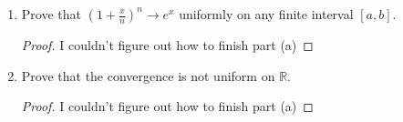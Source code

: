 \documentclass{article}
\begin{document}
\begin{enumerate}
\begin{enumerate}
\begin{proof}
\begin{align*}
                                                                                 & = \left\lvert\sum_{k=0}^n\frac{n!x^nn^k}{k!(n-k)!x^kn^n} - \frac{x^k}{k!}\right\rvert                        \\
                                                                                 & \leq \left\lvert\sum_{k=0}^n\frac{n^nx^nn^k}{k!(n-k)!x^kn^n} - \frac{x^k}{k!}\right\rvert                    \\
                                                                                 & = \left\lvert\sum_{k=0}^n\frac{x^nn^k}{k!(n-k)!x^k} - \frac{x^k}{k!}\right\rvert                             \\
                              \end{align*}
                        \end{proof}
                  \item Prove that $(1+\frac{x}{n})^n\to e^x$
                        uniformly on any finite interval $[a,b]$.
                        \begin{proof}
                              I couldn't figure out how to finish part (a)
                        \end{proof}
                  \item Prove that the convergence is not
                        uniform on $\mathbb{R}$.
                        \begin{proof}
                              I couldn't figure out how to finish part (a)
                        \end{proof}
            \end{enumerate}
\end{enumerate}
\end{document}
